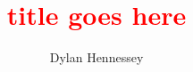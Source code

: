 \documentclass[12pt]{report}
\newcommand{\notetodylan}[1]{\textcolor{red}{#1}} %
\begin{document}
%
%
%
%
%
%
%
%
%
%
%
%
%
%
%
%
%
%
%
%
%
%
%
%
%
%
%
%
%
%
%
%
%
%
%
%
%
%
%
%

\dedication{\notetodylan{optional put something here}}%
%
%
%
%
%
%
%
%
%
%
%
%
%
%
%
%
%
%
%
%
%
%
%
%
%
%
%
%
%
%
%
%
%
%
%
%
%
%
%

\title{\notetodylan{title goes here}}
\author{Dylan Hennessey}%
%
%
%
%
%
%
%
%
%
%
%
%
%
%
%
%
%
%
%
%
%
%
%
%
%
%
%
%
%
%
%
%
%
%
%
%
%
%
%

\admin  	%
%
%
%
%
%
%
%
%
%
%
%
%
%
%
%
%
%
%
%
%
%
%
%
%
%
%
%
%
%
%
%
%
%
%
%
%
%
%
%
%
\end{document}
